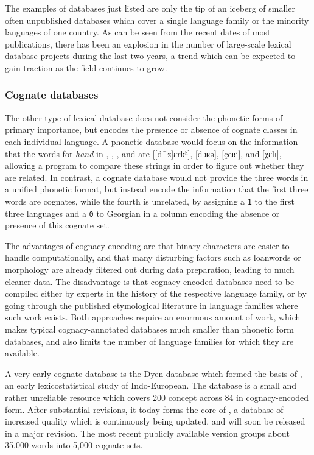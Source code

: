 The examples of databases just listed are only the tip of an iceberg of smaller often unpublished databases which cover a single language family or the minority languages of one country. As can be seen from the recent dates of most publications, there has been an explosion in the number of large-scale lexical database projects during the last two years, a trend which can be expected to gain traction as the field continues to grow.

\subsubsection{Cognate databases}
The other type of lexical database does not consider the phonetic forms of primary importance, but encodes the presence or absence of cognate classes in each individual language. A phonetic database would focus on the information that the words for \textit{hand} in , , , and  are 
{[[d⁀z]εrkʰ]}, 
{[dɔʀə]},
{[çeʀi]}, and
{[χεlɪ]}, 
allowing a program to compare these strings in order to figure out whether they are related. In contrast, a cognate database would not provide the three words in a unified phonetic format, but instead encode the information that the first three words are cognates, while the fourth is unrelated, by assigning a \texttt{1} to the first three languages  and a \texttt{0} to Georgian in a column encoding the absence or presence of this cognate set.

The advantages of cognacy encoding are that binary characters are easier to handle computationally, and that many disturbing factors such as loanwords or morphology are already filtered out during data preparation, leading to much cleaner data. The disadvantage is that cognacy-encoded databases need to be compiled either by experts in the history of the respective language family, or by going through the published etymological literature in language families where such work exists. Both approaches require an enormous amount of work, which makes typical cognacy-annotated databases much smaller than phonetic form databases, and also limits the number of language families for which they are available.

A very early cognate database is the Dyen database which formed the basis of \citet{dyen_ea_1992}, an early lexicostatistical study of Indo-European. The database is a small and rather unreliable resource \citep{geisler_list_2010} which covers 200 concept across 84  in cognacy-encoded form. After substantial revisions, it today forms the core of  \citep{ielex}, a database of increased quality which is continuously being updated, and will soon be released in a major revision. The most recent publicly available version groups about 35,000 words into 5,000 cognate sets.

